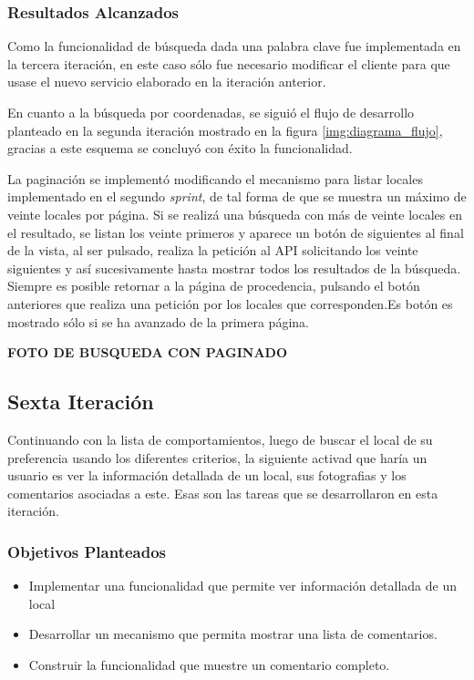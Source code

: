 \subsubsection{Resultados Alcanzados}

Como la funcionalidad de búsqueda dada una palabra clave fue implementada en la tercera iteración, en este caso sólo fue necesario modificar el cliente para que usase el nuevo servicio elaborado en la iteración anterior.

En cuanto a la búsqueda por coordenadas, se siguió el flujo de desarrollo planteado en la segunda iteración mostrado en la figura \ref{img:diagrama_flujo}, gracias a este esquema se concluyó con éxito la funcionalidad.

La paginación se implementó modificando el mecanismo para listar locales implementado en el segundo \textit{sprint}, de tal forma de que se muestra un máximo de veinte locales por página. Si se realizá una búsqueda con más de veinte locales en el resultado, se listan los veinte primeros y aparece un botón de siguientes al final de la vista, al ser pulsado, realiza la petición al API solicitando los veinte siguientes y así sucesivamente hasta mostrar todos los resultados de la búsqueda. Siempre es posible retornar a la página de procedencia, pulsando el botón anteriores que realiza una petición por los locales que corresponden.Es botón es mostrado sólo si se ha avanzado de la primera página.



 
\textbf{FOTO DE BUSQUEDA CON PAGINADO}


\subsection{Sexta Iteración}
Continuando con la lista de comportamientos, luego de buscar el local de su preferencia usando los diferentes criterios, la siguiente activad que haría un usuario es ver la información detallada de un local, sus fotografias y los comentarios asociadas a este. Esas son las tareas que se desarrollaron en esta iteración. 
\subsubsection{Objetivos Planteados} 

\begin{itemize}
\item Implementar una funcionalidad que permite ver información detallada de un local
\item Desarrollar un mecanismo que permita mostrar una lista de comentarios.
\item Construir la funcionalidad que muestre un comentario completo.
\end{itemize}

